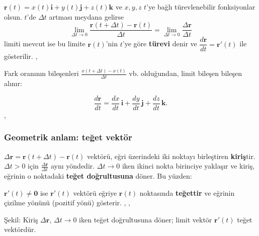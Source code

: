 \begin{tanim}[Türev]
$\mathbf r(t)=x(t)\mathbf i+y(t)\mathbf j+z(t)\mathbf k$ ve $x,y,z$ $t$'ye bağlı türevlenebilir fonksiyonlar olsun.
$t$'de $\Delta t$ artması meydana gelirse
\[ \lim_{\Delta t\to0}\frac{\mathbf r(t+\Delta t)-\mathbf r(t)}{\Delta t}=\lim_{\Delta t\to0}\frac{\Delta\mathbf r}{\Delta t} \]
limiti mevcut ise bu limite $\mathbf r(t)$'nin $t$'ye göre \textbf{türevi} denir ve $\dfrac{d\mathbf r}{dt}=\mathbf r'(t)$ ile gösterilir.
, 
\end{tanim}

Fark oranının bileşenleri $\frac{x(t+\Delta t)-x(t)}{\Delta t}$ vb. olduğundan, limit bileşen bileşen alınır:

\begin{teorem}
\[ \frac{d\mathbf r}{dt}=\frac{dx}{dt}\,\mathbf i+\frac{dy}{dt}\,\mathbf j+\frac{dz}{dt}\,\mathbf k . \]
, 
\end{teorem}

\subsubsection{Geometrik anlam: teğet vektör}

$\Delta\mathbf r=\mathbf r(t+\Delta t)-\mathbf r(t)$ vektörü, eğri üzerindeki iki noktayı birleştiren \textbf{kiriş}tir.
$\Delta t>0$ için $\frac{\Delta\mathbf r}{\Delta t}$ aynı yöndedir. $\Delta t\to0$ iken ikinci nokta birinciye yaklaşır ve
kiriş, eğrinin o noktadaki \textbf{teğet doğrultusuna} döner. Bu yüzden:

\begin{teorem}
$\mathbf r'(t)\neq\mathbf 0$ ise $\mathbf r'(t)$ vektörü eğriye $\mathbf r(t)$ noktasında \textbf{teğettir} ve eğrinin
çizilme yönünü (pozitif yönü) gösterir. , , 
\end{teorem}

\begin{center}

{\small Şekil: Kiriş $\Delta\mathbf r$, $\Delta t\to0$ iken teğet doğrultusuna döner; limit vektör $\mathbf r'(t)$ teğet vektördür.}
\end{center}

